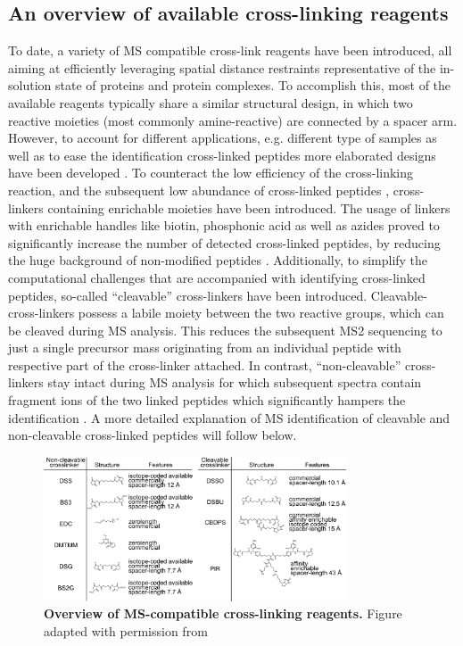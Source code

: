 \subsection{An overview of available cross-linking reagents}
To date, a variety of MS compatible cross-link reagents have been introduced, all aiming at efficiently leveraging spatial distance restraints representative of the in-solution state of proteins and protein complexes. To accomplish this, most of the available reagents typically share a similar structural design, in which two reactive moieties (most commonly amine-reactive) are connected by a spacer arm. However, to account for different applications, e.g. different type of samples as well as to ease the identification cross-linked peptides more elaborated designs have been developed \cite{Steigenberger_2020}. To counteract the low efficiency of the cross-linking reaction, and the subsequent low abundance of cross-linked peptides \cite{Leitner_2014, Leitner_2010}, cross-linkers containing enrichable moieties have been introduced. The usage of linkers with enrichable handles like biotin, phosphonic acid as well as azides proved to significantly increase the number of detected cross-linked peptides, by reducing the huge background of non-modified peptides \cite{Matzinger_2020, Steigenberger_2019, Tan_2016}. Additionally, to simplify the computational challenges that are accompanied with identifying cross-linked peptides, so-called “cleavable” cross-linkers have been introduced. Cleavable-cross-linkers possess a labile moiety between the two reactive groups, which can be cleaved during MS analysis. This reduces the subsequent MS2 sequencing to just a single precursor mass originating from an individual peptide with respective part of the cross-linker attached. In contrast, “non-cleavable” cross-linkers stay intact during MS analysis for which subsequent spectra contain fragment ions of the two linked peptides which significantly hampers the identification \cite{Kao_2011}. A more detailed explanation of MS identification of cleavable and non-cleavable cross-linked peptides will follow below.

\begin{figure}[hbt!]
\center
\includegraphics[width=0.8\textwidth]{Chapter.1/Figures/Figure2.png} 
\caption{\textbf{Overview of MS-compatible cross-linking reagents.} Figure adapted with permission from \cite{Steigenberger_2020}}
\label{fig:fig2}
\end{figure}

